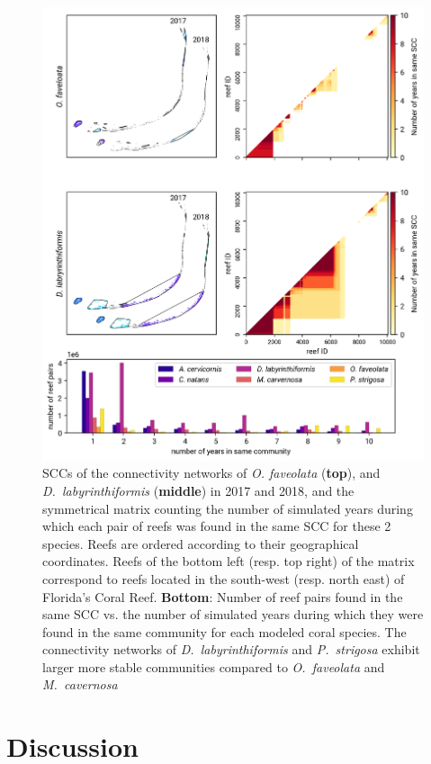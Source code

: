 \documentclass[preprint,12pt,authoryear]{elsarticle}
\begin{document}
\begin{figure}
    \centering
    \includegraphics[width=.9\textwidth]{figures/comparison_sccs.png}
    \caption{SCCs of the connectivity networks of \textit{O. faveolata} (\textbf{top}), and \textit{D.~labyrinthiformis} (\textbf{middle}) in 2017 and 2018, and the symmetrical matrix counting the number of simulated years during which each pair of reefs was found in the same SCC for these 2 species. Reefs are ordered according to their geographical coordinates. Reefs of the bottom left (resp. top right) of the matrix correspond to reefs located in the south-west (resp. north east) of Florida's Coral Reef. \textbf{Bottom}: Number of reef pairs found in the same SCC vs. the number of simulated years during which they were found in the same community for each modeled coral species. The connectivity networks of \textit{D.~labyrinthiformis} and \textit{P.~strigosa} exhibit larger more stable communities compared to \textit{O.~faveolata} and \textit{M.~cavernosa}}\label{fig:scc}
\end{figure}


\section*{Discussion}
\end{document}
